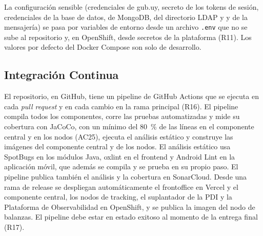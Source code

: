La configuración sensible (credenciales de gub.uy, secreto de los tokens de sesión, credenciales de la base de datos, de MongoDB, del directorio LDAP y y de la mensajería) se pasa por variables de entorno desde un archivo \texttt{.env} que no se sube al repositorio y, en OpenShift, desde secretos de la plataforma (R11). Los valores por defecto del Docker Compose son solo de desarrollo.

\subsection{Integración Continua}

El repositorio, en GitHub, tiene un pipeline de GitHub Actions que se ejecuta en cada \textit{pull request} y en cada cambio en la rama principal (R16). El pipeline compila todos los componentes, corre las pruebas automatizadas y mide su cobertura con JaCoCo, con un mínimo del 80~\% de las líneas en el componente central y en los nodos (AC25), ejecuta el análisis estático y construye las imágenes del componente central y de los nodos. El análisis estático usa SpotBugs en los módulos Java, oxlint en el frontend y Android Lint en la aplicación móvil, que además se compila y se prueba en su propio paso. El pipeline publica también el análisis y la cobertura en SonarCloud. Desde una rama de release se despliegan automáticamente el frontoffice en Vercel y el componente central, los nodos de tracking, el suplantador de la PDI y la Plataforma de Observabilidad en OpenShift, y se publica la imagen del nodo de balanzas. El pipeline debe estar en estado exitoso al momento de la entrega final (R17).

